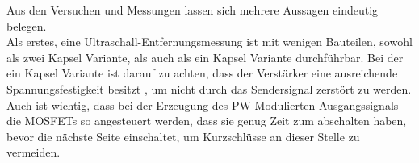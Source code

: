 Aus den Versuchen und Messungen lassen sich mehrere Aussagen eindeutig belegen. \\
Als erstes, eine Ultraschall-Entfernungsmessung ist mit wenigen Bauteilen, sowohl als zwei Kapsel Variante, als auch als ein Kapsel Variante durchführbar. Bei der ein Kapsel Variante ist darauf zu achten, dass der Verstärker eine ausreichende Spannungsfestigkeit besitzt , um nicht durch das Sendersignal zerstört zu werden. Auch ist wichtig, dass bei der Erzeugung des PW-Modulierten Ausgangssignals die MOSFETs so angesteuert werden, dass sie genug Zeit zum abschalten haben, bevor die nächste Seite einschaltet, um Kurzschlüsse an dieser Stelle zu vermeiden. 
